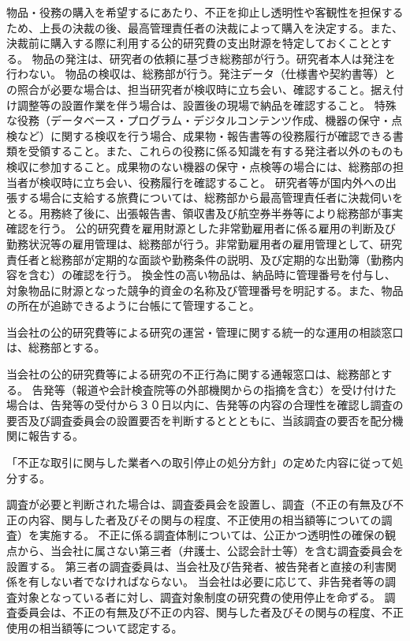 \documentclass[10pt,a4paper,uplatex]{jsarticle}
\begin{document}
物品・役務の購入を希望するにあたり、不正を抑止し透明性や客観性を担保するため、上長の決裁の後、最高管理責任者の決裁によって購入を決定する。また、決裁前に購入する際に利用する公的研究費の支出財源を特定しておくこととする。
\term 物品の発注は、研究者の依頼に基づき総務部が行う。研究者本人は発注を行わない。 
\term 物品の検収は、総務部が行う。発注データ（仕様書や契約書等）との照合が必要な場合は、担当研究者が検収時に立ち会い、確認すること。据え付け調整等の設置作業を伴う場合は、設置後の現場で納品を確認すること。
\term 特殊な役務（データベース・プログラム・デジタルコンテンツ作成、機器の保守・点
検など）に関する検収を行う場合、成果物・報告書等の役務履行が確認できる書類を受領すること。また、これらの役務に係る知識を有する発注者以外のものも検収に参加すること。成果物のない機器の保守・点検等の場合には、総務部の担当者が検収時に立ち会い、役務履行を確認すること。
\term 研究者等が国内外への出張する場合に支給する旅費については、総務部から最高管理責任者に決裁伺いをとる。用務終了後に、出張報告書、領収書及び航空券半券等により総務部が事実確認を行う。
\term 公的研究費を雇用財源とした非常勤雇用者に係る雇用の判断及び勤務状況等の雇用管理は、総務部が行う。非常勤雇用者の雇用管理として、研究責任者と総務部が定期的な面談や勤務条件の説明、及び定期的な出勤簿（勤務内容を含む）の確認を行う。
\term 換金性の高い物品は、納品時に管理番号を付与し、対象物品に財源となった競争的資金の名称及び管理番号を明記する。また、物品の所在が追跡できるように台帳にて管理すること。

当会社の公的研究費等による研究の運営・管理に関する統一的な運用の相談窓口は、総務部とする。

当会社の公的研究費等による研究の不正行為に関する通報窓口は、総務部とする。
\term 告発等（報道や会計検査院等の外部機関からの指摘を含む）を受け付けた場合は、告発等の受付から３０日以内に、告発等の内容の合理性を確認し調査の要否及び調査委員会の設置要否を判断するととともに、当該調査の要否を配分機関に報告する。

「不正な取引に関与した業者への取引停止の処分方針」の定めた内容に従って処分する。

調査が必要と判断された場合は、調査委員会を設置し、調査（不正の有無及び不正の内容、関与した者及びその関与の程度、不正使用の相当額等についての調査）を実施する。
\term 不正に係る調査体制については、公正かつ透明性の確保の観点から、当会社に属さない第三者（弁護士、公認会計士等）を含む調査委員会を設置する。
\term 第三者の調査委員は、当会社及び告発者、被告発者と直接の利害関係を有しない者でなければならない。
\term 当会社は必要に応じて、非告発者等の調査対象となっている者に対し、調査対象制度の研究費の使用停止を命ずる。
\term 調査委員会は、不正の有無及び不正の内容、関与した者及びその関与の程度、不正使用の相当額等について認定する。
\end{document}
